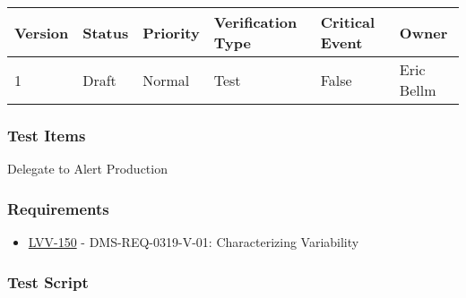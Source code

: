 \begin{longtable}[]{@{}llllll@{}}
\toprule
Version & Status & Priority & Verification Type & Critical Event &
Owner\tabularnewline
\midrule
\endhead
1 & Draft & Normal & Test & False & Eric Bellm\tabularnewline
\bottomrule
\end{longtable}

\hypertarget{test-items-32}{%
\subsubsection{Test Items}\label{test-items-32}}

Delegate to Alert Production

\hypertarget{requirements-33}{%
\subsubsection{Requirements}\label{requirements-33}}

\begin{itemize}
\tightlist
\item
  \href{https://jira.lsstcorp.org/browse/LVV-150}{LVV-150} -
  DMS-REQ-0319-V-01: Characterizing Variability
\end{itemize}

\hypertarget{test-script-33}{%
\subsubsection{Test Script}\label{test-script-33}}

